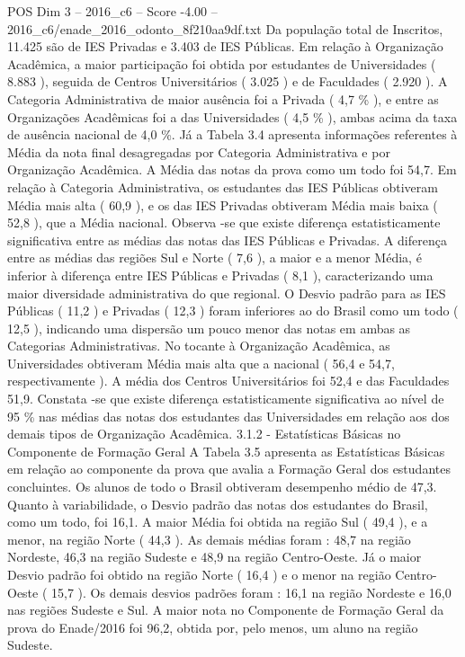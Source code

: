 \begin{textsample}{POS Dim 3 – 2016\_c6 – Score -4.00 – 2016\_c6/enade\_2016\_odonto\_8f210aa9df.txt}
Da população total de Inscritos, 11.425 são de IES Privadas e 3.403 de IES Públicas.
Em relação à Organização Acadêmica, a maior participação foi obtida por estudantes de Universidades ( 8.883 ), seguida de Centros Universitários ( 3.025 ) e de Faculdades ( 2.920 ).
A Categoria Administrativa de maior ausência foi a Privada ( 4,7 \% ), e entre as Organizações Acadêmicas foi a das Universidades ( 4,5 \% ), ambas acima da taxa de ausência nacional de 4,0 \%.
Já a Tabela 3.4 apresenta informações referentes à Média da nota final desagregadas por Categoria Administrativa e por Organização Acadêmica.
A Média das notas da prova como um todo foi 54,7.
Em relação à Categoria Administrativa, os estudantes das IES Públicas obtiveram Média mais alta ( 60,9 ), e os das IES Privadas obtiveram Média mais baixa ( 52,8 ), que a Média nacional.
Observa -se que existe diferença estatisticamente significativa entre as médias das notas das IES Públicas e Privadas.
A diferença entre as médias das regiões Sul e Norte ( 7,6 ), a maior e a menor Média, é inferior à diferença entre IES Públicas e Privadas ( 8,1 ), caracterizando uma maior diversidade administrativa do que regional.
O Desvio padrão para as IES Públicas ( 11,2 ) e Privadas ( 12,3 ) foram inferiores ao do Brasil como um todo ( 12,5 ), indicando uma dispersão um pouco menor das notas em ambas as Categorias Administrativas.
No tocante à Organização Acadêmica, as Universidades obtiveram Média mais alta que a nacional ( 56,4 e 54,7, respectivamente ).
A média dos Centros Universitários foi 52,4 e das Faculdades 51,9.
Constata -se que existe diferença estatisticamente significativa ao nível de 95 \% nas médias das notas dos estudantes das Universidades em relação aos dos demais tipos de Organização Acadêmica. 3.1.2 - Estatísticas Básicas no Componente de Formação Geral A Tabela 3.5 apresenta as Estatísticas Básicas em relação ao componente da prova que avalia a Formação Geral dos estudantes concluintes.
Os alunos de todo o Brasil obtiveram desempenho médio de 47,3.
Quanto à variabilidade, o Desvio padrão das notas dos estudantes do Brasil, como um todo, foi 16,1.
A maior Média foi obtida na região Sul ( 49,4 ), e a menor, na região Norte ( 44,3 ).
As demais médias foram : 48,7 na região Nordeste, 46,3 na região Sudeste e 48,9 na região Centro-Oeste.
Já o maior Desvio padrão foi obtido na região Norte ( 16,4 ) e o menor na região Centro-Oeste ( 15,7 ).
Os demais desvios padrões foram : 16,1 na região Nordeste e 16,0 nas regiões Sudeste e Sul.
A maior nota no Componente de Formação Geral da prova do Enade/2016 foi 96,2, obtida por, pelo menos, um aluno na região Sudeste.

\end{textsample}
